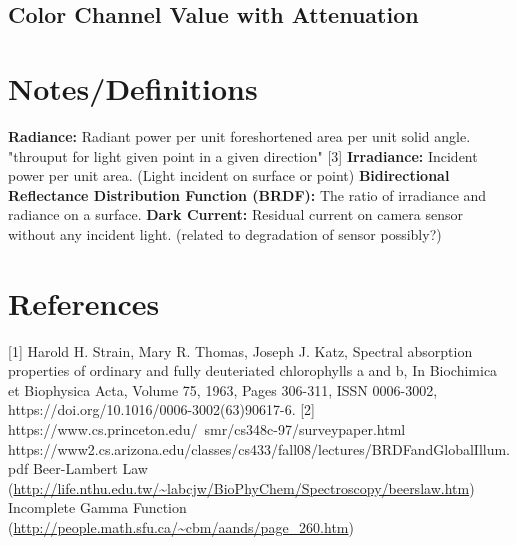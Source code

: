 \documentclass{article}
\begin{document}
\subsection{Color Channel Value with Attenuation}



\section{Notes/Definitions}

\textbf{Radiance:} Radiant power per unit foreshortened area per unit solid angle. "throuput for light given point in a given direction" [3]
\newline
\textbf{Irradiance:} Incident power per unit area. (Light incident on surface or point)
\newline
\textbf{Bidirectional Reflectance Distribution Function (BRDF):} The ratio of irradiance and radiance on a surface.
\textbf{Dark Current:} Residual current on camera sensor without any incident light. (related to degradation of sensor possibly?)



\section{References}

[1] Harold H. Strain, Mary R. Thomas, Joseph J. Katz, Spectral absorption properties of ordinary and fully deuteriated chlorophylls a and b,
In Biochimica et Biophysica Acta, Volume 75, 1963, Pages 306-311,
ISSN 0006-3002, https://doi.org/10.1016/0006-3002(63)90617-6. \newline
[2] https://www.cs.princeton.edu/~smr/cs348c-97/surveypaper.html \newline
[3] https://www2.cs.arizona.edu/classes/cs433/fall08/lectures/BRDFandGlobalIllum.pdf
\newline
[4] Beer-Lambert Law (\url{http://life.nthu.edu.tw/~labcjw/BioPhyChem/Spectroscopy/beerslaw.htm}) \newline
[5] Incomplete Gamma Function (\url{http://people.math.sfu.ca/~cbm/aands/page_260.htm})
\end{document}
